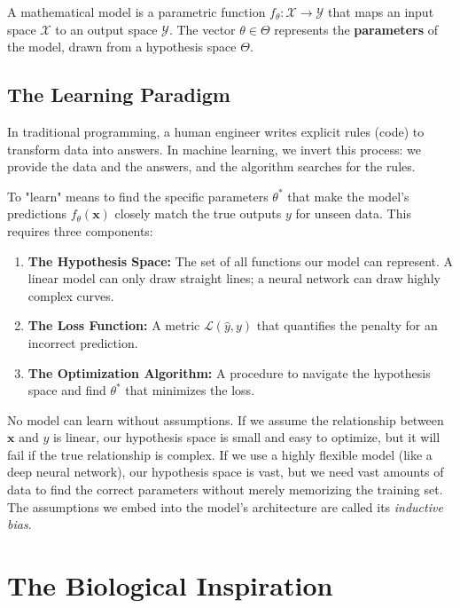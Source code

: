 \documentclass{tufte-handout}
\begin{document}
\begin{defn}
A mathematical model is a parametric function $f_\theta: \mathcal{X} \to \mathcal{Y}$ that maps an input space $\mathcal{X}$ to an output space $\mathcal{Y}$. The vector $\theta \in \Theta$ represents the \textbf{parameters} of the model, drawn from a hypothesis space $\Theta$.
\end{defn}

\subsection{The Learning Paradigm}

In traditional programming, a human engineer writes explicit rules (code) to transform data into answers. In machine learning, we invert this process: we provide the data and the answers, and the algorithm searches for the rules.

To "learn" means to find the specific parameters $\theta^*$ that make the model's predictions $f_\theta(\mathbf{x})$ closely match the true outputs $y$ for unseen data. This requires three components:
\begin{enumerate}[leftmargin=*, itemsep=2pt]
    \item \textbf{The Hypothesis Space:} The set of all functions our model can represent. A linear model can only draw straight lines; a neural network can draw highly complex curves.
    \item \textbf{The Loss Function:} A metric $\mathcal{L}(\hat{y}, y)$ that quantifies the penalty for an incorrect prediction.
    \item \textbf{The Optimization Algorithm:} A procedure to navigate the hypothesis space and find $\theta^*$ that minimizes the loss.
\end{enumerate}

\begin{remark}
No model can learn without assumptions. If we assume the relationship between $\mathbf{x}$ and $y$ is linear, our hypothesis space is small and easy to optimize, but it will fail if the true relationship is complex. If we use a highly flexible model (like a deep neural network), our hypothesis space is vast, but we need vast amounts of data to find the correct parameters without merely memorizing the training set. The assumptions we embed into the model's architecture are called its \textit{inductive bias}.
\end{remark}

\section{The Biological Inspiration}
\end{document}
